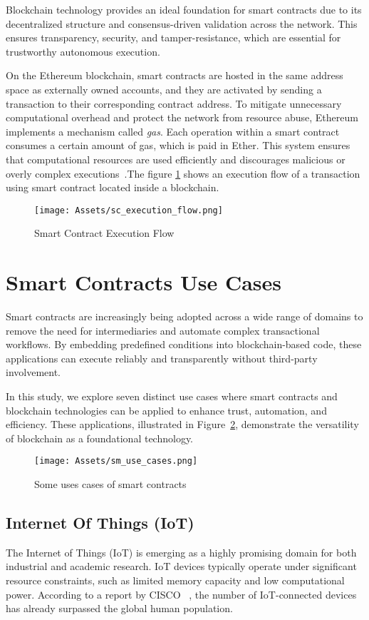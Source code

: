 Blockchain technology provides an ideal foundation for smart contracts due to its decentralized structure and consensus-driven validation across the network. This ensures transparency, security, and tamper-resistance, which are essential for trustworthy autonomous execution.

On the Ethereum blockchain, smart contracts are hosted in the same address space as externally owned accounts, and they are activated by sending a transaction to their corresponding contract address. To mitigate unnecessary computational overhead and protect the network from resource abuse, Ethereum implements a mechanism called \textit{gas}. Each operation within a smart contract consumes a certain amount of gas, which is paid in Ether. This system ensures that computational resources are used efficiently and discourages malicious or overly complex executions~\cite{buterin2014whitepaper}.The figure \ref{fig:smart_contract_execution_flow} shows an execution flow of a transaction using smart contract located inside a blockchain.
\begin{figure}[H]
    \centering
    \texttt{[image: Assets/sc\_execution\_flow.png]}
    \caption{Smart Contract Execution Flow}
    \label{fig:smart_contract_execution_flow}
\end{figure}

\section{Smart Contracts Use Cases}
Smart contracts are increasingly being adopted across a wide range of domains to remove the need for intermediaries and automate complex transactional workflows. By embedding predefined conditions into blockchain-based code, these applications can execute reliably and transparently without third-party involvement. 

In this study, we explore seven distinct use cases where smart contracts and blockchain technologies can be applied to enhance trust, automation, and efficiency. These applications, illustrated in Figure~\ref{fig:smart_contract_usecases}, demonstrate the versatility of blockchain as a foundational technology. 
\begin{figure}[H]
    \centering
    \texttt{[image: Assets/sm\_use\_cases.png]}
    \caption{Some uses cases of smart contracts ~\cite{durieux2020empirical}}
    \label{fig:smart_contract_usecases}
\end{figure}
\subsection{Internet Of Things (IoT)}
The Internet of Things (IoT) is emerging as a highly promising domain for both industrial and academic research. IoT devices typically operate under significant resource constraints, such as limited memory capacity and low computational power. According to a report by CISCO ~\cite{cisco2020internetreport}, the number of IoT-connected devices has already surpassed the global human population.

